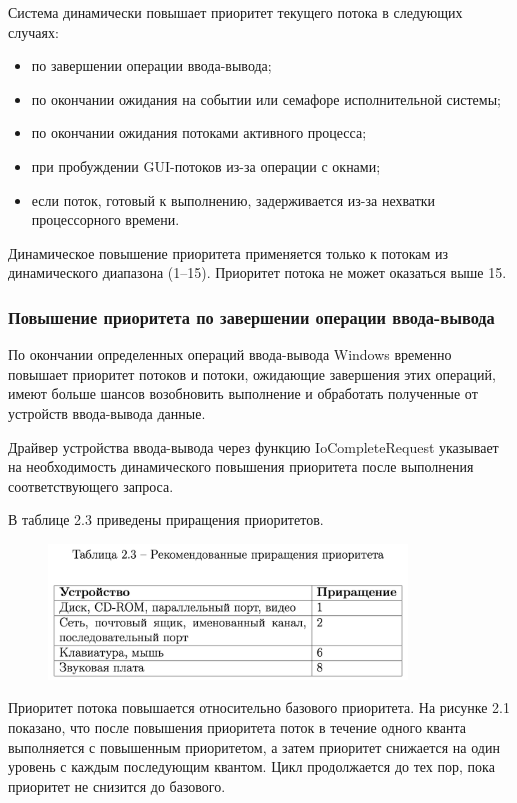 Система динамически повышает приоритет текущего потока в следующих случаях:

\begin{itemize}
	\item по завершении операции ввода-вывода;
	\item  по окончании ожидания на событии или семафоре исполнительной системы;
	\item по окончании ожидания потоками активного процесса;
	\item при пробуждении GUI-потоков из-за операции с окнами;
	\item если поток, готовый к выполнению, задерживается из-за нехватки процессорного времени.
\end{itemize}

Динамическое повышение приоритета применяется только к потокам из динамического диапазона (1--15). Приоритет потока не может оказаться выше 15. 

\subsubsection*{Повышение приоритета по завершении операции ввода-вывода}

По окончании определенных операций ввода-вывода Windows временно повышает приоритет потоков и потоки, ожидающие завершения этих операций, имеют больше шансов возобновить выполнение и обработать полученные от устройств ввода-вывода данные.

Драйвер устройства ввода-вывода через функцию IoCompleteRequest указывает на необходимость динамического повышения приоритета после выполнения соответствующего запроса.

В таблице 2.3 приведены приращения приоритетов.

\begin{figure}[h!]
	\centering
	\includegraphics[scale=1.0, width=0.85\textwidth]{assets/table-3}
\end{figure}


Приоритет потока повышается относительно базового приоритета. На рисунке 2.1 показано, что после повышения приоритета поток в течение одного кванта выполняется с повышенным приоритетом, а затем приоритет снижается на один уровень с каждым последующим квантом. Цикл продолжается до тех пор, пока приоритет не снизится до базового.

